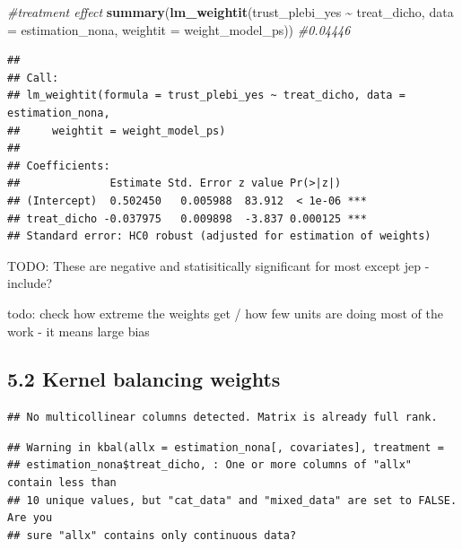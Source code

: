 \documentclass[
]{article}
\newenvironment{Shaded}{\begin{snugshade}}{\end{snugshade}}
\newcommand{\AttributeTok}[1]{\textcolor[rgb]{0.13,0.29,0.53}{#1}}
\newcommand{\CommentTok}[1]{\textcolor[rgb]{0.56,0.35,0.01}{\textit{#1}}}
\newcommand{\ConstantTok}[1]{\textcolor[rgb]{0.56,0.35,0.01}{#1}}
\newcommand{\FunctionTok}[1]{\textcolor[rgb]{0.13,0.29,0.53}{\textbf{#1}}}
\newcommand{\NormalTok}[1]{#1}
\newcommand{\OtherTok}[1]{\textcolor[rgb]{0.56,0.35,0.01}{#1}}
\newcommand{\SpecialCharTok}[1]{\textcolor[rgb]{0.81,0.36,0.00}{\textbf{#1}}}
\begin{document}
\begin{Shaded}
\begin{Highlighting}[]
\CommentTok{\#treatment effect}
\FunctionTok{summary}\NormalTok{(}\FunctionTok{lm\_weightit}\NormalTok{(trust\_plebi\_yes }\SpecialCharTok{\textasciitilde{}}\NormalTok{ treat\_dicho, }\AttributeTok{data =}\NormalTok{ estimation\_nona, }\AttributeTok{weightit =}\NormalTok{ weight\_model\_ps)) }\CommentTok{\#0.04446}
\end{Highlighting}
\end{Shaded}

\begin{verbatim}
## 
## Call:
## lm_weightit(formula = trust_plebi_yes ~ treat_dicho, data = estimation_nona, 
##     weightit = weight_model_ps)
## 
## Coefficients:
##              Estimate Std. Error z value Pr(>|z|)    
## (Intercept)  0.502450   0.005988  83.912  < 1e-06 ***
## treat_dicho -0.037975   0.009898  -3.837 0.000125 ***
## Standard error: HC0 robust (adjusted for estimation of weights)
\end{verbatim}

TODO: These are negative and statisitically significant for most except
jep - include?

todo: check how extreme the weights get / how few units are doing most
of the work - it means large bias

\subsection{5.2 Kernel balancing
weights}\label{kernel-balancing-weights}

\begin{Shaded}
\end{Shaded}

\begin{verbatim}
## No multicollinear columns detected. Matrix is already full rank.
\end{verbatim}

\begin{verbatim}
## Warning in kbal(allx = estimation_nona[, covariates], treatment =
## estimation_nona$treat_dicho, : One or more columns of "allx" contain less than
## 10 unique values, but "cat_data" and "mixed_data" are set to FALSE. Are you
## sure "allx" contains only continuous data?
\end{verbatim}
\end{document}
